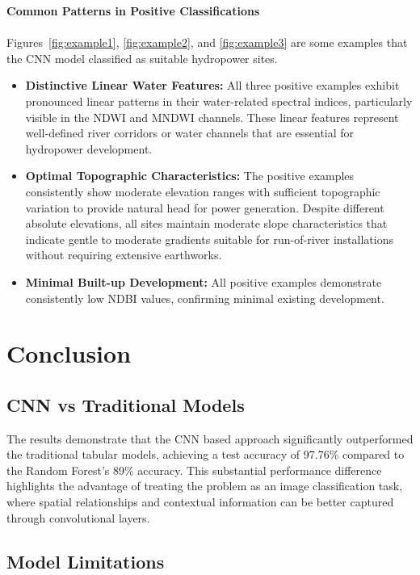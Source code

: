 \documentclass[12pt,a4paper]{article}
\begin{document}
\textbf{Common Patterns in Positive Classifications}
\\
\\
Figures~\ref{fig:example1}, \ref{fig:example2}, and \ref{fig:example3}
are some examples that the CNN model classified as suitable hydropower sites.
\begin{itemize}
  \item \textbf{Distinctive Linear Water Features:} All three positive examples
  exhibit pronounced linear patterns in their water-related spectral indices,
  particularly visible in the NDWI and MNDWI channels. These linear features
  represent well-defined river corridors or water channels that are essential
  for hydropower development.
  \item \textbf{Optimal Topographic Characteristics:} The positive examples
  consistently show moderate elevation ranges with sufficient topographic
  variation to provide natural head for power generation. Despite different
  absolute elevations, all sites maintain moderate slope characteristics that
  indicate gentle to moderate gradients suitable for run-of-river installations
  without requiring extensive earthworks.
  \item \textbf{Minimal Built-up Development:} All positive examples demonstrate
  consistently low NDBI values, confirming minimal existing development.
\end{itemize}


\newpage
\section{Conclusion}

\subsection{CNN vs Traditional Models}

The results demonstrate that the CNN based approach significantly outperformed
the traditional tabular models, achieving a test accuracy of 97.76\% compared
to the Random Forest's 89\% accuracy. This substantial performance difference
highlights the advantage of treating the problem as an image classification
task, where spatial relationships and contextual information can be better
captured through convolutional layers.

\subsection{Model Limitations}
\end{document}
